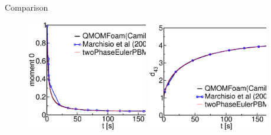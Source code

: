 \documentclass{beamer}
\begin{document}
\begin{frame}{Comparison}
   \begin{figure}[H]
  
    \includegraphics[width=0.47\textwidth,keepaspectratio]{m0}
    \includegraphics[width=0.47\textwidth,keepaspectratio]{d34}
\end{figure} 
\end{frame}
\end{document}
